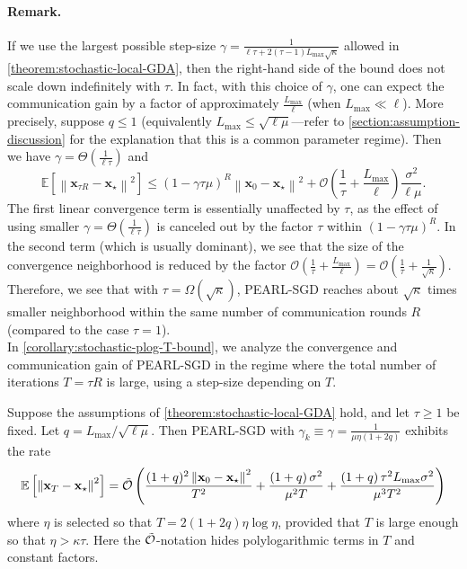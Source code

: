\documentclass{article}
\newcommand{\algname}[1]{{\color{PineGreen}\sf  #1}\xspace}
\newcommand{\vx}{{\mathbf{x}}}
\newcommand{\cO}{{\mathcal{O}}}
\newcommand{\sqnorm}[1]{\left\| #1 \right\|^2}
\newcommand{\abbvname}{\algname{PEARL-SGD}}
\theoremstyle{plain}
\theoremstyle{remark}
\begin{document}
\paragraph{Remark.} If we use the largest possible step-size $\gamma = \frac{1}{\ell\tau + 2(\tau - 1) L_{\mathrm{max}} \sqrt{\kappa}}$ allowed in \cref{theorem:stochastic-local-GDA}, then the right-hand side of the bound does not scale down indefinitely with $\tau$.
In fact, with this choice of $\gamma$, one can expect the communication gain by a factor of approximately $\frac{L_\mathrm{max}}{\ell}$ (when $L_{\mathrm{max}} \ll \ell$).
More precisely, suppose $q \le 1$ (equivalently $L_\mathrm{max} \le \sqrt{\ell\mu}$---refer to \cref{section:assumption-discussion} for the explanation that this is a common parameter regime).
Then we have $\gamma = \Theta\left(\frac{1}{\ell\tau}\right)$ and 
\[
    \mathbb{E}\left[\sqnorm{\vx_{\tau R} - \vx_\star}\right] \le (1-\gamma\tau\mu)^R \sqnorm{\vx_0 - \vx_\star} + \cO \left( \frac{1}{\tau} + \frac{L_\mathrm{max}}{\ell} \right) \frac{\sigma^2}{\ell\mu} .
\]
The first linear convergence term is essentially unaffected by $\tau$, as the effect of using smaller $\gamma = \Theta\left(\frac{1}{\ell\tau}\right)$ is canceled out by the factor $\tau$ within $(1-\gamma\tau\mu)^R$.
In the second term (which is usually dominant), we see that the size of the convergence neighborhood is reduced by the factor $\cO \left( \frac{1}{\tau} + \frac{L_\mathrm{max}}{\ell} \right) = \cO \left( \frac{1}{\tau} + \frac{1}{\sqrt
\kappa} \right)$.
Therefore, we see that with $\tau = \Omega(\sqrt{\kappa})$, \abbvname reaches about $\sqrt{\kappa}$ times smaller neighborhood within the same number of communication rounds $R$ (compared to the case $\tau=1$). \\

In \cref{corollary:stochastic-plog-T-bound}, we analyze the convergence and communication gain of \abbvname in the regime where the total number of iterations $T=\tau R$ is large, %
using a step-size depending on $T$.

\begin{corollary}
\label{corollary:stochastic-plog-T-bound}
Suppose the assumptions of \cref{theorem:stochastic-local-GDA} hold, and let $\tau \ge 1$ be fixed. 
Let $q = L_\mathrm{max}/\sqrt{\ell\mu}$.
Then \abbvname with $\gamma_k \equiv \gamma = \frac{1}{\mu\eta (1+2q)}$ exhibits the rate
\begin{align*}
    \mathbb{E}\left[\sqnorm{\vx_T - \vx_\star}\right] = \Tilde{\cO} \left( \frac{(1+q)^2 \sqnorm{\vx_0 - \vx_\star}}{T^2} + \frac{\left(1+q\right) \sigma^2}{\mu^2 T} + \frac{\left(1+q\right) \tau^2 L_{\mathrm{max}} \sigma^2}{\mu^3 T^2} \right)
\end{align*}
where $\eta$ is selected so that $T = 2\left(1+2q\right)\eta\log\eta$, provided that $T$ is large enough so that $\eta > \kappa\tau$.
Here the $\Tilde{\cO}$-notation hides polylogarithmic terms in $T$ and constant factors.
\end{corollary}
\end{document}
